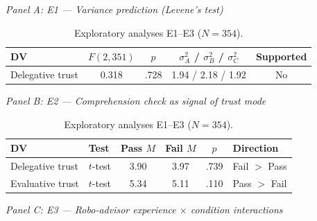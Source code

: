 
\begin{table}[H]
\centering
\begin{threeparttable}
\caption{Exploratory analyses E1--E3 ($N = 354$).}
\label{tab:supp_exploratory}
\begin{small}\centering
\textit{Panel A: E1 --- Variance prediction (Levene's test)}

\medskip
\begin{tabular}{lcccc}
\toprule
DV & $F(2, 351)$ & $p$ & $\sigma^2_A$ / $\sigma^2_B$ / $\sigma^2_C$ & Supported \\
\midrule
Delegative trust & 0.318 & .728 & 1.94 / 2.18 / 1.92 & No \\
\bottomrule
\end{tabular}

\bigskip
\textit{Panel B: E2 --- Comprehension check as signal of trust mode}

\medskip
\begin{tabular}{llcccl}
\toprule
DV & Test & Pass $M$ & Fail $M$ & $p$ & Direction \\
\midrule
Delegative trust  & $t$-test & 3.90 & 3.97 & .739 & Fail $>$ Pass \\
Evaluative trust  & $t$-test & 5.34 & 5.11 & .110 & Pass $>$ Fail \\
\bottomrule
\end{tabular}

\bigskip
\textit{Panel C: E3 --- Robo-advisor experience $\times$ condition interactions}


\end{small}
\end{threeparttable}
\end{table}
